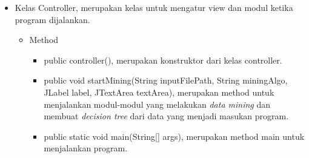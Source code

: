 \begin{itemize}
	\item Kelas Controller, merupakan kelas untuk mengatur view dan modul ketika program dijalankan.
	\begin{itemize}
		\item Method
		\begin{itemize}
			\item public controller(), merupakan konstruktor dari kelas controller.
			\item public void startMining(String inputFilePath, String miningAlgo, JLabel label, JTextArea textArea), merupakan method untuk menjalankan modul-modul yang melakukan \textsl{data mining} dan membuat \textsl{decision tree} dari data yang menjadi masukan program.
			\item public static void main(String[] args), merupakan method main untuk menjalankan program.		
		\end{itemize}	
	\end{itemize}
	

\end{itemize}
